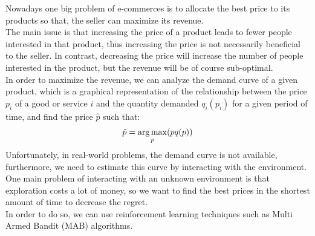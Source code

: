Nowadays one big problem of e-commerces is to allocate the best price to its products so that,
the seller can maximize its revenue.\\
The main issue is that increasing the price of a product leads to fewer people interested in that product, thus
increasing the price is not necessarily beneficial to the seller. In contrast, decreasing the price will increase the number
of people interested in the product, but the revenue will be of course sub-optimal.\\
In order to maximize the revenue, we can analyze the demand curve of a given product, which is
a graphical representation of the relationship between the price $p_i$ of a good or service $i$ and the quantity demanded $q_i(p_i)$
for a given period of time, and find the price $\hat{p}$ such that:
\begin{align*}
    \hat{p} = \operatorname*{arg\,max}_p(pq(p))
\end{align*}
Unfortunately, in real-world problems, the demand curve is not available, furthermore, we need to estimate this curve by interacting with the environment. One main problem of interacting with an unknown environment is that exploration costs a lot of money, so we want to find the best prices in the shortest amount of time to decrease the regret. \\
In order to do so, we can use reinforcement learning techniques such as Multi Armed Bandit (MAB) algorithms.
